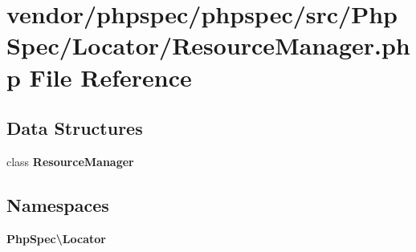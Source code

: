 \section{vendor/phpspec/phpspec/src/\+Php\+Spec/\+Locator/\+Resource\+Manager.php File Reference}
\label{_resource_manager_8php}
\subsection*{Data Structures}
\begin{DoxyCompactItemize}
\item 
class {\bf Resource\+Manager}
\end{DoxyCompactItemize}
\subsection*{Namespaces}
\begin{DoxyCompactItemize}
\item 
 {\bf Php\+Spec\textbackslash{}\+Locator}
\end{DoxyCompactItemize}
